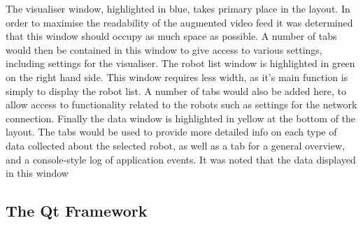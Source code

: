 The visualiser window, highlighted in blue, takes primary place in the layout. In order to maximise the readability of the augmented video feed it was determined that this window should occupy as much space as possible. A number of tabs would then be contained in this window to give access to various settings, including settings for the visualiser. The robot list window is highlighted in green on the right hand side. This window requires less width, as it's main function is simply to display the robot list. A number of tabs would also be added here, to allow access to functionality related to the robots such as settings for the network connection. Finally the data window is highlighted in yellow at the bottom of the layout. The tabs would be used to provide more detailed info on each type of data collected about the selected robot, as well as a tab for a general overview, and a console-style log of application events. It was noted that the data displayed in this window 

\subsection{The Qt Framework}


